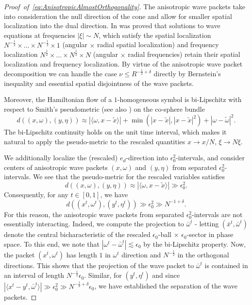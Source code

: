 \documentclass{amsart}
\theoremstyle{definition}
\begin{document}
\begin{proof}[Proof~of~\eqref{eq:AnisotropicAlmostOrthogonality}]
The anisotropic wave packets take into consideration the null direction of the cone and allow for smaller spatial localization into the dual direction. In \cite[Proposition~5.2]{GebaTataru2007} was proved that solutions to wave equations at frequencies $|\xi| \sim N$, which satisfy the spatial localization $N^{-\frac{1}{2}} \times \ldots \times N^{-\frac{1}{2}} \times 1$ (angular $\times$ radial spatial localization) and frequency localization $N^{\frac{1}{2}} \times \ldots \times N^{\frac{1}{2}} \times N$ (angular $\times$ radial frequencies) retain their spatial localization and frequency localization. 
By virtue of the anisotropic wave packet decomposition we can handle the case $\nu \leq R^{-\frac{1}{2}+\delta}$ directly by Bernstein's inequality and essential spatial disjointness of the wave packets.

Moreover, the Hamiltonian flow of a $1$-homogeneous symbol is bi-Lipschitz with respect to Smith's pseudometric \cite{Smith1998} (see also \cite{GebaTataru2007}) on the co-sphere bundle
\begin{equation*}
d((x,\omega),(y,\eta)) \approx | \langle \omega , x - \tilde{x} \rangle | + \min(|x-\tilde{x}|,|x-\tilde{x}|^2) + | \omega - \tilde{\omega}|^2.
\end{equation*}
The bi-Lipschitz continuity holds on the unit time interval, which makes it natural to apply the pseudo-metric to the rescaled quantities $x \to x /N$, $\xi \to N \xi$.

We additionally localize the (rescaled) $e_d$-direction into $ \epsilon_0^2$-intervals, and consider centers of anisotropic wave packets $(x,\omega)$ and $(y,\eta)$ from separated $\epsilon_0^2$-intervals. We see that the pseudo-metric for the rescaled variables satisfies
\begin{equation*}
d((x,\omega),(y,\eta)) \approx | \langle \omega, x- \tilde{x} \rangle| \gg \epsilon_0^2.
\end{equation*}
Consequently, for any $t \in [0,1]$, we have
\begin{equation*}
d((x^t,\omega^t),(y^t,\eta^t)) \gg \epsilon_0^2 \gg N^{-1+\delta}.
\end{equation*}
For this reason, the anisotropic wave packets from separated $\epsilon_0^2$-intervals are not essentially interacting.
Indeed, we compute the projection to $\bar{\omega}^t$ - letting $(\bar{x}^t,\bar{\omega}^t)$ denote the central bicharacteristic of the rescaled $\epsilon_0$-ball $\times$ $\epsilon_0$-sector in phase space. To this end, we note that $|\omega^t - \bar{\omega}^t| \lesssim \epsilon_0$ by the bi-Lipschitz property. Now, the packet $(x^t,\omega^t)$ has length $1$ in $\omega^t$ direction and $N^{-\frac{1}{2}}$ in the orthogonal directions. This shows that the projection of the wave packet to $\bar{\omega}^t$ is contained in an interval of length $N^{-\frac{1}{2}} \epsilon_0$. Similar, for $(y^t,\eta^t)$ and since $|\langle x^t - y^t, \bar{\omega}^t \rangle| \gg \epsilon_0^2 \gg N^{-\frac{1}{2}+\delta} \epsilon_0$, we have established the separation of the wave packets. 
\end{proof}
\end{document}
